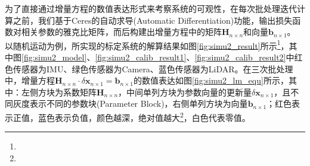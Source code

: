 为了直接通过增量方程的数值表达形式来考察系统的可观性，在每次批处理迭代计算之前，我们基于Ceres的自动求导(Automatic Differentiation)功能，输出损失函数对相关参数的雅克比矩阵，而后构建出增量方程中的矩阵$\boldsymbol{H}_{n\times n}$和向量$\boldsymbol{b}_{n\times 1}$。
以随机运动为例，所实现的标定系统的解算结果如图\ref{fig:simu2_result}所示\footnote{}，其中图\ref{fig:simu2_model}、\ref{fig:simu2_calib_result1}、\ref{fig:simu2_calib_result2}中红色传感器为IMU、绿色传感器为Camera、蓝色传感器为LiDAR。在三次批处理中，增量方程$\boldsymbol{H}_{n\times n}\cdot\delta\boldsymbol{x}_{n\times 1}=\boldsymbol{b}_{n\times 1}$的数值表达如图\ref{fig:simu2_lm_equ}所示，其中：左侧方块为系数矩阵$\boldsymbol{H}_{n\times n}$，中间单列方块为参数向量的更新量$\delta\boldsymbol{x}_{n\times 1}$，且不同灰度表示不同的参数块(Parameter Block)，右侧单列方块为向量$\boldsymbol{b}_{n\times 1}$；红色表示正值，蓝色表示负值，颜色越深，绝对值越大\footnote{}，白色代表零值。

